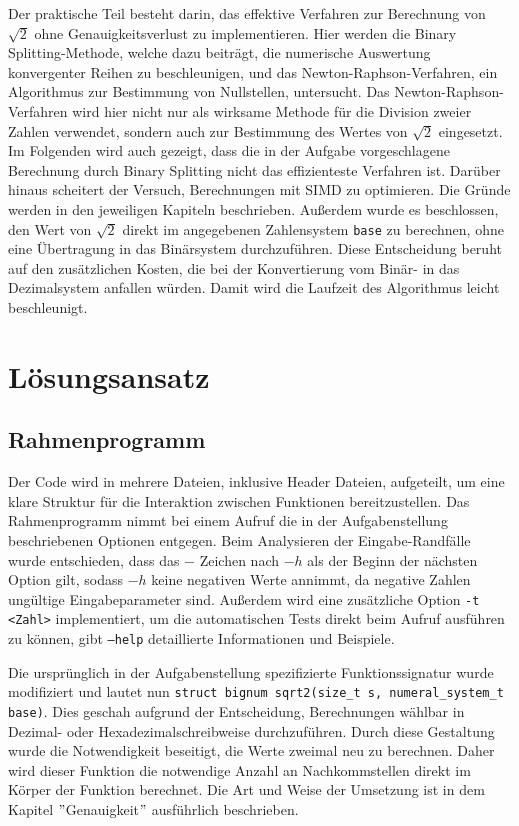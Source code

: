 \documentclass[course=erap]{aspdoc}
\begin{document}
 Der praktische Teil besteht darin, das effektive Verfahren zur Berechnung von $\sqrt{2}$ ohne Genauigkeitsverlust zu implementieren. Hier werden die Binary Splitting-Methode, welche dazu beiträgt, die numerische Auswertung konvergenter Reihen zu beschleunigen, und das Newton-Raphson-Verfahren, ein Algorithmus zur Bestimmung von Nullstellen, untersucht. Das Newton-Raphson-Verfahren wird hier nicht nur als wirksame Methode für die Division zweier Zahlen verwendet, sondern auch zur Bestimmung des Wertes von $\sqrt{2}$ eingesetzt. Im Folgenden wird auch gezeigt, dass die in der Aufgabe vorgeschlagene Berechnung durch Binary Splitting nicht das effizienteste Verfahren ist. Darüber hinaus scheitert der Versuch, Berechnungen mit SIMD zu optimieren. Die Gründe werden in den jeweiligen Kapiteln beschrieben. Außerdem wurde es beschlossen, den Wert von $\sqrt{2}$ direkt im angegebenen Zahlensystem \texttt{base} zu berechnen, ohne eine Übertragung in das Binärsystem durchzuführen. Diese Entscheidung beruht auf den zusätzlichen Kosten, die bei der Konvertierung vom Binär- in das Dezimalsystem anfallen würden. Damit wird die Laufzeit des Algorithmus leicht beschleunigt.
 
\section{Lösungsansatz}
\subsection{Rahmenprogramm}
Der Code wird in mehrere Dateien, inklusive Header Dateien, aufgeteilt, um eine klare Struktur für die Interaktion zwischen Funktionen bereitzustellen. Das Rahmenprogramm nimmt bei einem Aufruf die in der Aufgabenstellung beschriebenen Optionen entgegen. Beim Analysieren der Eingabe-Randfälle wurde entschieden, dass das $-$ Zeichen nach $-h$ als der Beginn der nächsten Option gilt, sodass $-h$ keine negativen Werte annimmt, da negative Zahlen ungültige Eingabeparameter sind. Außerdem wird eine zusätzliche Option \texttt{-t <Zahl>} implementiert, um die automatischen Tests direkt beim Aufruf ausführen zu können,  gibt \texttt{--help} detaillierte Informationen und Beispiele. 

Die ursprünglich in der Aufgabenstellung spezifizierte Funktionssignatur wurde modifiziert und lautet nun \texttt{struct bignum sqrt2(size\_t s, numeral\_system\_t base)}. Dies geschah aufgrund der Entscheidung, Berechnungen  wählbar in Dezimal- oder Hexadezimalschreibweise  durchzuführen. Durch diese Gestaltung wurde die Notwendigkeit beseitigt, die Werte zweimal neu zu berechnen. Daher wird dieser Funktion die notwendige Anzahl an Nachkommstellen direkt im Körper der Funktion berechnet. Die Art und Weise der Umsetzung ist in dem Kapitel $"$Genauigkeit$"$ ausführlich beschrieben.
\end{document}
